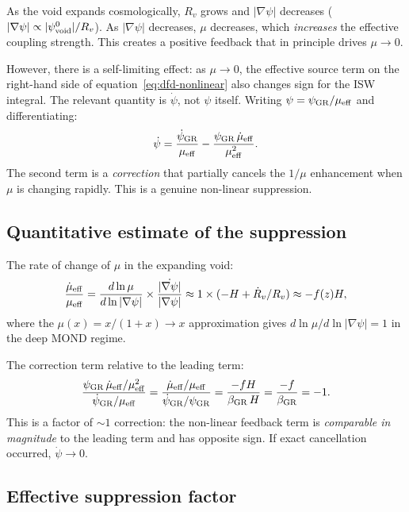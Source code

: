 \documentclass[11pt]{article}
\newcommand{\mufd}{\mu}
\newcommand{\GR}{{\rm GR}}
\begin{document}
As the void expands cosmologically, $R_v$ grows and $|\nabla\psi|$
decreases ($|\nabla\psi| \propto |\psi_{\rm void}^0|/R_v$).  As
$|\nabla\psi|$ decreases, $\mufd$ decreases, which \emph{increases}
the effective coupling strength.  This creates a positive feedback
that in principle drives $\mufd \to 0$.

However, there is a self-limiting effect: as $\mufd \to 0$, the
effective source term on the right-hand side of equation~\eqref{eq:dfd-nonlinear}
also changes sign for the ISW integral.  The relevant quantity is
$\dot\psi$, not $\psi$ itself.  Writing $\psi = \psi_{\rm GR}/\mufd_{\rm eff}$
and differentiating:
\begin{equation}\label{eq:psidot-nonlinear}
  \dot\psi = \frac{\dot\psi_{\GR}}{\mufd_{\rm eff}}
  - \frac{\psi_{\GR}\,\dot\mufd_{\rm eff}}{\mufd_{\rm eff}^2}.
\end{equation}
The second term is a \emph{correction} that partially cancels the
$1/\mufd$ enhancement when $\mufd$ is changing rapidly.  This is a
genuine non-linear suppression.

\subsection{Quantitative estimate of the suppression}

The rate of change of $\mufd$ in the expanding void:
\begin{equation}
  \frac{\dot\mufd_{\rm eff}}{\mufd_{\rm eff}} = \frac{d\ln\mufd}{d\ln|\nabla\psi|}
  \times\frac{\dot{|\nabla\psi|}}{|\nabla\psi|}
  \approx 1\times(-H + \dot R_v/R_v)
  \approx -f(z)H,
\end{equation}
where the $\mufd(x) = x/(1+x) \to x$ approximation gives
$d\ln\mufd/d\ln|\nabla\psi| = 1$ in the deep MOND regime.

The correction term relative to the leading term:
\begin{equation}
  \frac{\psi_{\GR}\,\dot\mufd_{\rm eff}/\mufd_{\rm eff}^2}
  {\dot\psi_{\GR}/\mufd_{\rm eff}}
  = \frac{\dot\mufd_{\rm eff}/\mufd_{\rm eff}}{\dot\psi_{\GR}/\psi_{\GR}}
  = \frac{-f H}{\beta_{\GR}\,H} = \frac{-f}{\beta_{\GR}} = -1.
\end{equation}
This is a factor of $\sim 1$ correction: the non-linear feedback term
is \emph{comparable in magnitude} to the leading term and has opposite
sign.  If exact cancellation occurred, $\dot\psi \to 0$.

\subsection{Effective suppression factor}
\end{document}
